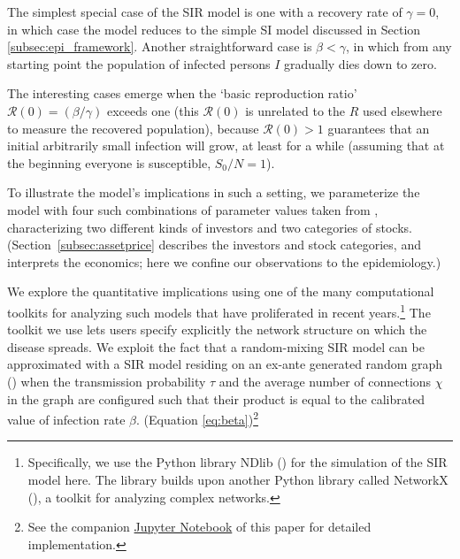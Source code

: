 
The simplest special case of the SIR model is one with a recovery rate of $\gamma=0$, in which case the model reduces to the simple SI model discussed in Section \ref{subsec:epi_framework}.  Another straightforward case is $\beta < \gamma$, in which from any starting point the population of infected persons $I$ gradually dies down to zero.

\newcommand{\Rzero}{\mathcal{R}(0)}

The interesting cases emerge when the `basic reproduction ratio' $\Rzero = (\beta/\gamma)$ exceeds one (this $\Rzero$ is unrelated to the $R$ used elsewhere to measure the recovered population), because $\Rzero > 1$ guarantees that an initial arbitrarily small infection will grow, at least for a while (assuming that at the beginning everyone is susceptible, $S_{0}/N = 1$).

To illustrate the model's implications in such a setting, we parameterize the model with four such combinations of parameter values taken from \cite{shiller1989survey}, characterizing two different kinds of investors and two categories of stocks.  (Section~\ref{subsec:assetprice} describes the investors and stock categories, and interprets the economics; here we confine our observations to the epidemiology.)

We explore the quantitative implications using one of the many computational toolkits for analyzing such models that have proliferated in recent years.\footnote{Specifically, we use the Python library NDlib (\cite{rossetti2018ndlib}) for the simulation of the SIR model here. The library builds upon another Python library called NetworkX (\cite{hagberg2008exploring}), a toolkit for analyzing complex networks.}  The toolkit we use lets users specify explicitly the network structure on which the disease spreads. We exploit the fact that a random-mixing SIR model can be approximated with a SIR model residing on an ex-ante generated random graph (\cite{erdos1960evolution}) when the transmission probability $\tau$ and the average number of connections $\chi$ in the graph are configured such that their product is equal to the calibrated value of infection rate $\beta$. (Equation \ref{eq:beta})\footnote{See the companion \href{https://github.com/iworld1991/EpiExp/blob/master/Python/SIR_Ndlib.ipynb}{Jupyter Notebook} of this paper for detailed implementation.}

